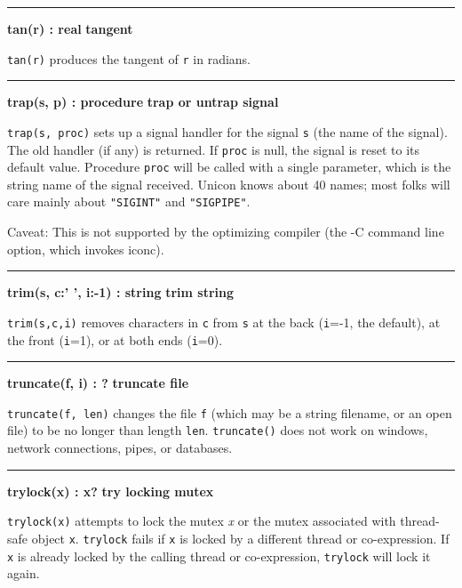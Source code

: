 \bigskip\hrule\vspace{0.1cm}
\noindent
{\bf tan(r) : real } \hfill {\bf tangent}

\noindent
{}\texttt{tan(r)} produces the tangent of \texttt{r} in
radians.

\bigskip\hrule\vspace{0.1cm}
\noindent
{\bf trap(s, p) : procedure } \hfill {\bf trap or untrap signal}

\noindent
{}\texttt{trap(s, proc)} sets up a signal handler for
the signal \texttt{s} (the name of the signal). The old handler (if
any) is returned. If \texttt{proc} is null, the signal is reset to its
default value. Procedure \texttt{proc} will be called with a single parameter,
which is the string name of the signal received. Unicon knows about 40
names; most folks will care mainly about
\texttt{"SIGINT"} and \texttt{"SIGPIPE"}.

Caveat: This is not supported by the optimizing
compiler (the -C command line option, which invokes iconc).

\bigskip\hrule\vspace{0.1cm}
\noindent
{\bf trim(s, c:' ', i:{}-1) : string } \hfill {\bf trim string}

\noindent
{}\texttt{trim(s,c,i)} removes characters in \texttt{c}
from \texttt{s} at the back (\texttt{i}=-1, the default), at the front
(\texttt{i}=1), or at both ends (\texttt{i}=0).

\bigskip\hrule\vspace{0.1cm}
\noindent
{\bf truncate(f, i) : ? } \hfill {\bf truncate file}

\noindent
{}\texttt{truncate(f, len)} changes the file
\texttt{f} (which may be a string filename, or an open file) to be no
longer than length \texttt{len}. \texttt{truncate()} does not work on
windows, network connections, pipes, or databases.

\bigskip\hrule\vspace{0.1cm}
\noindent
{\bf trylock(x) : x? } \hfill {\bf try locking mutex}

\noindent
{}\texttt{trylock(x)} attempts to lock the mutex {\textit x} or the
mutex associated with thread-safe object \texttt{x}. \texttt{trylock} fails
if \texttt{x} is locked by a different thread or co-expression. If \texttt{x}
is already locked by the calling thread or co-expression, \texttt{trylock}
will lock it again.

